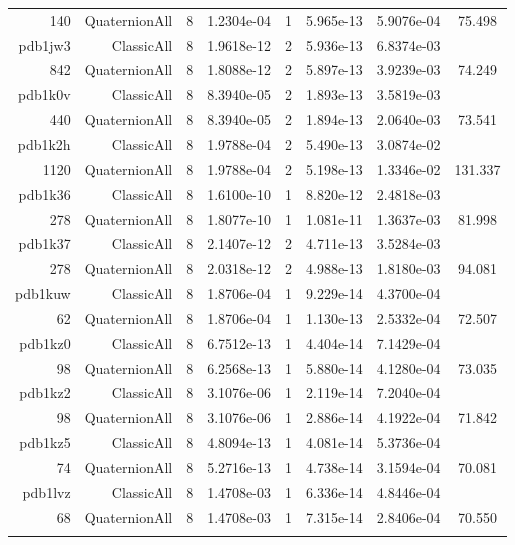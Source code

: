 \begin{xltabular}{\textwidth}{r|rcS[table-format=1.4e+2]cS[table-format=1.3e+2]S[table-format=1.4e+2]S[table-format=-1.3]}
140 & QuaternionAll & 8 & 1.2304e-04 & 1 & 5.965e-13 & 5.9076e-04 & 75.498\\  \addlinespace
pdb1jw3 & ClassicAll & 8 & 1.9618e-12 & 2 & 5.936e-13 & 6.8374e-03 & \\
842 & QuaternionAll & 8 & 1.8088e-12 & 2 & 5.897e-13 & 3.9239e-03 & 74.249\\  \addlinespace
pdb1k0v & ClassicAll & 8 & 8.3940e-05 & 2 & 1.893e-13 & 3.5819e-03 & \\
440 & QuaternionAll & 8 & 8.3940e-05 & 2 & 1.894e-13 & 2.0640e-03 & 73.541\\  \addlinespace
pdb1k2h & ClassicAll & 8 & 1.9788e-04 & 2 & 5.490e-13 & 3.0874e-02 & \\
1120 & QuaternionAll & 8 & 1.9788e-04 & 2 & 5.198e-13 & 1.3346e-02 & 131.337\\  \addlinespace
pdb1k36 & ClassicAll & 8 & 1.6100e-10 & 1 & 8.820e-12 & 2.4818e-03 & \\
278 & QuaternionAll & 8 & 1.8077e-10 & 1 & 1.081e-11 & 1.3637e-03 & 81.998\\  \addlinespace
pdb1k37 & ClassicAll & 8 & 2.1407e-12 & 2 & 4.711e-13 & 3.5284e-03 & \\
278 & QuaternionAll & 8 & 2.0318e-12 & 2 & 4.988e-13 & 1.8180e-03 & 94.081\\  \addlinespace
pdb1kuw & ClassicAll & 8 & 1.8706e-04 & 1 & 9.229e-14 & 4.3700e-04 & \\
62 & QuaternionAll & 8 & 1.8706e-04 & 1 & 1.130e-13 & 2.5332e-04 & 72.507\\  \addlinespace
pdb1kz0 & ClassicAll & 8 & 6.7512e-13 & 1 & 4.404e-14 & 7.1429e-04 & \\
98 & QuaternionAll & 8 & 6.2568e-13 & 1 & 5.880e-14 & 4.1280e-04 & 73.035\\  \addlinespace
pdb1kz2 & ClassicAll & 8 & 3.1076e-06 & 1 & 2.119e-14 & 7.2040e-04 & \\
98 & QuaternionAll & 8 & 3.1076e-06 & 1 & 2.886e-14 & 4.1922e-04 & 71.842\\  \addlinespace
pdb1kz5 & ClassicAll & 8 & 4.8094e-13 & 1 & 4.081e-14 & 5.3736e-04 & \\
74 & QuaternionAll & 8 & 5.2716e-13 & 1 & 4.738e-14 & 3.1594e-04 & 70.081\\  \addlinespace
pdb1lvz & ClassicAll & 8 & 1.4708e-03 & 1 & 6.336e-14 & 4.8446e-04 & \\
68 & QuaternionAll & 8 & 1.4708e-03 & 1 & 7.315e-14 & 2.8406e-04 & 70.550\\  \addlinespace

\end{xltabular}
